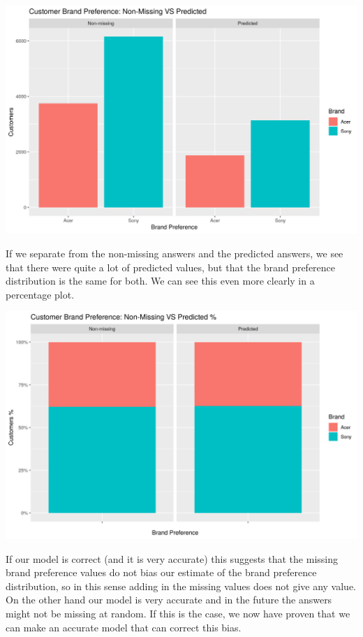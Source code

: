 \documentclass[12pt,a4paper,leqno]{report}
\theoremstyle{plain}
\theoremstyle{definition}
\theoremstyle{remark}
\begin{document}
\bigskip
{
    \centering
    \includegraphics[width=\textwidth,height=\textheight,keepaspectratio]{brand_preference_marked.png}
    \par
}
\bigskip

If we separate from the non-missing answers and the predicted answers, we see
that there were quite a lot of predicted values, but that the brand preference distribution
is the same for both. We can see this even more clearly in a percentage plot.

\bigskip
{
    \centering
    \includegraphics[width=\textwidth,height=\textheight,keepaspectratio]{brand_preference_marked_percentages.png}
    \par
}
\bigskip

If our model is correct (and it is very accurate) this suggests that the missing brand preference values
do not bias our estimate of the brand preference distribution, so in this sense adding in the missing
values does not give any value. On the other hand our model is very accurate and in the future
the answers might not be missing at random. If this is the case, we now have proven that we can make
an accurate model that can correct this bias.
\end{document}
